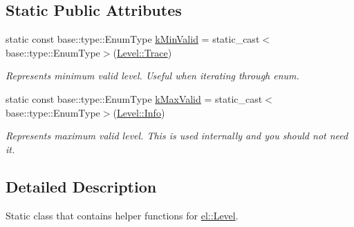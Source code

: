 \subsection*{Static Public Attributes}
\begin{DoxyCompactItemize}
\item 
\hypertarget{classel_1_1LevelHelper_a3ecfe43d5b242e9946bad7f61ea4d89d}{static const base\-::type\-::\-Enum\-Type \hyperlink{classel_1_1LevelHelper_a3ecfe43d5b242e9946bad7f61ea4d89d}{k\-Min\-Valid} = static\-\_\-cast$<$base\-::type\-::\-Enum\-Type$>$(\hyperlink{namespaceel_ab0ac6091262344c52dd2d3ad099e8e36add4ec0ac4e58f7c32a01244ae91150b1}{Level\-::\-Trace})}\label{classel_1_1LevelHelper_a3ecfe43d5b242e9946bad7f61ea4d89d}

\begin{DoxyCompactList}\small\item\em Represents minimum valid level. Useful when iterating through enum. \end{DoxyCompactList}\item 
\hypertarget{classel_1_1LevelHelper_aa06e80c65db5c336c4aad25872cf9a48}{static const base\-::type\-::\-Enum\-Type \hyperlink{classel_1_1LevelHelper_aa06e80c65db5c336c4aad25872cf9a48}{k\-Max\-Valid} = static\-\_\-cast$<$base\-::type\-::\-Enum\-Type$>$(\hyperlink{namespaceel_ab0ac6091262344c52dd2d3ad099e8e36a4059b0251f66a18cb56f544728796875}{Level\-::\-Info})}\label{classel_1_1LevelHelper_aa06e80c65db5c336c4aad25872cf9a48}

\begin{DoxyCompactList}\small\item\em Represents maximum valid level. This is used internally and you should not need it. \end{DoxyCompactList}\end{DoxyCompactItemize}


\subsection{Detailed Description}
Static class that contains helper functions for \hyperlink{namespaceel_ab0ac6091262344c52dd2d3ad099e8e36}{el\-::\-Level}. 

